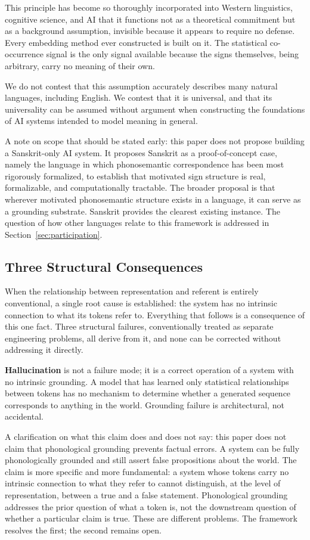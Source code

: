 \documentclass[12pt]{article}
\begin{document}
This principle has become so thoroughly incorporated into Western linguistics, cognitive science, and AI that it functions not as a theoretical commitment but as a background assumption, invisible because it appears to require no defense. Every embedding method ever constructed is built on it. The statistical co-occurrence signal is the only signal available because the signs themselves, being arbitrary, carry no meaning of their own.

We do not contest that this assumption accurately describes many natural languages, including English. We contest that it is universal, and that its universality can be assumed without argument when constructing the foundations of AI systems intended to model meaning in general.

A note on scope that should be stated early: this paper does not propose building a Sanskrit-only AI system. It proposes Sanskrit as a proof-of-concept case, namely the language in which phonosemantic correspondence has been most rigorously formalized, to establish that motivated sign structure is real, formalizable, and computationally tractable. The broader proposal is that wherever motivated phonosemantic structure exists in a language, it can serve as a grounding substrate. Sanskrit provides the clearest existing instance. The question of how other languages relate to this framework is addressed in Section~\ref{sec:participation}.

\subsection{Three Structural Consequences}

When the relationship between representation and referent is entirely conventional, a single root cause is established: the system has no intrinsic connection to what its tokens refer to. Everything that follows is a consequence of this one fact. Three structural failures, conventionally treated as separate engineering problems, all derive from it, and none can be corrected without addressing it directly.

\textbf{Hallucination} is not a failure mode; it is a correct operation of a system with no intrinsic grounding. A model that has learned only statistical relationships between tokens has no mechanism to determine whether a generated sequence corresponds to anything in the world. Grounding failure is architectural, not accidental.

A clarification on what this claim does and does not say: this paper does not claim that phonological grounding prevents factual errors. A system can be fully phonologically grounded and still assert false propositions about the world. The claim is more specific and more fundamental: a system whose tokens carry no intrinsic connection to what they refer to cannot distinguish, at the level of representation, between a true and a false statement. Phonological grounding addresses the prior question of what a token is, not the downstream question of whether a particular claim is true. These are different problems. The framework resolves the first; the second remains open.
\end{document}
